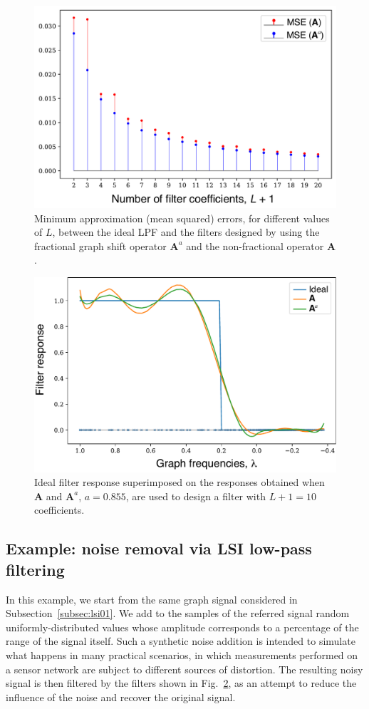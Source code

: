 \begin{figure}[t!]
	\centering
\includegraphics[width=0.65\linewidth]{Figures/ERROR_mse_min.pdf}
	\caption{Minimum approximation (mean squared) errors, for different values of $L$, between the ideal LPF and the filters designed by using the fractional graph shift operator $\mathbf{A}^a$ and the non-fractional operator $\mathbf{A}$.}%
	\label{fig:usa03}%
\end{figure}

\begin{figure}[t!]
	\centering
\includegraphics[width=0.65\linewidth]{Figures/ERROR_estacoes_resposta_grau10.pdf}%
	\caption{Ideal filter response superimposed on the responses obtained when $\mathbf{A}$ and $\mathbf{A}^a$, $a=0.855$, are used to design a filter with $L+1=10$ coefficients.}
	\label{fig:usa04}%
\end{figure}

\subsection{Example: noise removal via LSI low-pass filtering}\label{subsec:lsi02}
In this example, we start from the same graph signal considered in Subsection~\ref{subsec:lsi01}. We add to the samples of the referred signal random uniformly-distributed values whose amplitude corresponds to a percentage of the range of the signal itself. Such a synthetic noise addition is intended to simulate what happens in many practical scenarios, in which measurements performed on a sensor network are subject to different sources of distortion. The resulting noisy signal is then filtered by the filters shown in Fig.~\ref{fig:usa04}, as an attempt to reduce the influence of the noise and recover the original signal.

